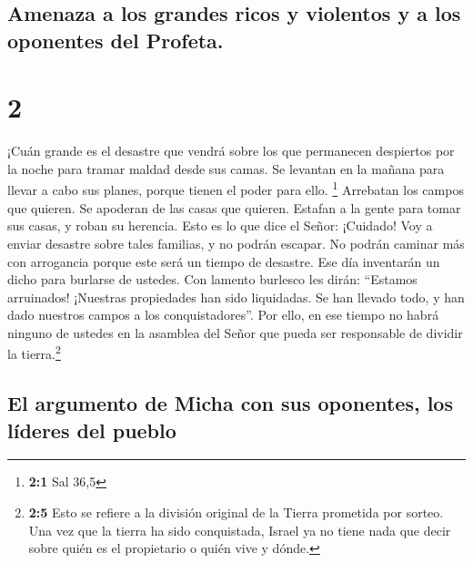 \hypertarget{amenaza-a-los-grandes-ricos-y-violentos-y-a-los-oponentes-del-profeta.}{%
\subsection{Amenaza a los grandes ricos y violentos y a los oponentes
del
Profeta.}\label{amenaza-a-los-grandes-ricos-y-violentos-y-a-los-oponentes-del-profeta.}}

\hypertarget{section-1}{%
\section{2}\label{section-1}}

 ¡Cuán grande es el desastre que vendrá sobre los que
permanecen despiertos por la noche para tramar maldad desde sus camas.
Se levantan en la mañana para llevar a cabo sus planes, porque tienen el
poder para ello. \footnote{\textbf{2:1} Sal 36,5} 
Arrebatan los campos que quieren. Se apoderan de las casas que quieren.
Estafan a la gente para tomar sus casas, y roban su herencia.
 Esto es lo que dice el Señor: ¡Cuidado! Voy a enviar
desastre sobre tales familias, y no podrán escapar. No podrán caminar
más con arrogancia porque este será un tiempo de desastre.
 Ese día inventarán un dicho para burlarse de ustedes. Con
lamento burlesco les dirán: ``Estamos arruinados! ¡Nuestras propiedades
han sido liquidadas. Se han llevado todo, y han dado nuestros campos a
los conquistadores''.  Por ello, en ese tiempo no habrá
ninguno de ustedes en la asamblea del Señor que pueda ser responsable de
dividir la tierra.\footnote{\textbf{2:5} Esto se refiere a la división
  original de la Tierra prometida por sorteo. Una vez que la tierra ha
  sido conquistada, Israel ya no tiene nada que decir sobre quién es el
  propietario o quién vive y dónde.}

\hypertarget{el-argumento-de-micha-con-sus-oponentes-los-luxedderes-del-pueblo}{%
\subsection{El argumento de Micha con sus oponentes, los líderes del
pueblo}\label{el-argumento-de-micha-con-sus-oponentes-los-luxedderes-del-pueblo}}

